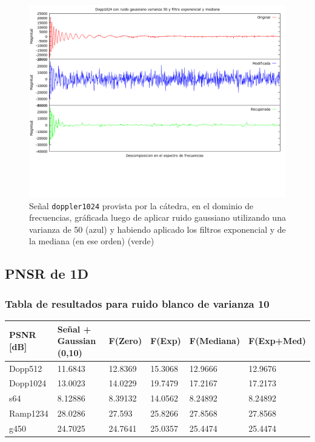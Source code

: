 \begin{figure}[H]
\begin {center}
\includegraphics[width=500pt]{imagenes/dopp1024-gauss-50-bothr.png}
\end {center}
\caption{Se\~nal \texttt{doppler1024} provista por la c\'atedra, en el dominio de frecuencias, gr\'aficada
luego de aplicar ruido gaussiano utilizando una varianza de 50 (azul) y 
habiendo aplicado los filtros exponencial y de la mediana (en ese orden) (verde)}
\label{fig:expmedGauss50}
\end{figure}

\newpage
\subsection{PNSR de 1D}

\subsubsection{Tabla de resultados para ruido blanco de varianza 10}

\begin{table}[H]
        \begin{tabular}{|l|lllll|}
                \hline
                \textbf{PSNR [dB]} & Se\~nal + Gaussian (0,10) & F(Zero) & F(Exp) & F(Mediana) & F(Exp+Med) \\ \hline
                    Dopp512 & 11.6843 							& 12.8369 & 15.3068 & 12.9666  &  12.9676 \\
                    Dopp1024 & 13.0023 							& 14.0229 & 19.7479 & 17.2167  &  17.2173 \\
                    s64 & 8.12886 								& 8.39132 & 14.0562 & 8.24892  &   8.24892\\
                    Ramp1234 & 28.0286 							& 27.593 & 25.8266 & 27.8568  &  27.8568 \\
                    g450 & 24.7025 								& 24.7641 & 25.0357 & 25.4474  &   25.4474 \\ \hline
                    \end{tabular}
                \end{table}


